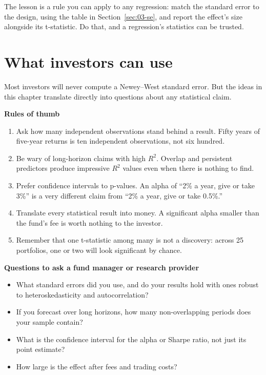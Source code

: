 The lesson is a rule you can apply to any regression: match the standard error to the design, using the table in Section~\ref{sec:03-se}, and report the effect's size alongside its t-statistic. Do that, and a regression's statistics can be trusted.

\section{What investors can use}
\label{sec:03-investors}

Most investors will never compute a Newey--West standard error. But the ideas in this chapter translate directly into questions about any statistical claim.

\textbf{Rules of thumb}

\begin{enumerate}
  \item Ask how many independent observations stand behind a result. Fifty years of five-year returns is ten independent observations, not six hundred.
  \item Be wary of long-horizon claims with high $R^2$. Overlap and persistent predictors produce impressive $R^2$ values even when there is nothing to find.
  \item Prefer confidence intervals to p-values. An alpha of ``2\% a year, give or take 3\%'' is a very different claim from ``2\% a year, give or take 0.5\%.''
  \item Translate every statistical result into money. A significant alpha smaller than the fund's fee is worth nothing to the investor.
  \item Remember that one t-statistic among many is not a discovery: across 25 portfolios, one or two will look significant by chance.
\end{enumerate}

\textbf{Questions to ask a fund manager or research provider}

\begin{itemize}
  \item What standard errors did you use, and do your results hold with ones robust to heteroskedasticity and autocorrelation?
  \item If you forecast over long horizons, how many non-overlapping periods does your sample contain?
  \item What is the confidence interval for the alpha or Sharpe ratio, not just its point estimate?
  \item How large is the effect after fees and trading costs?
\end{itemize}

